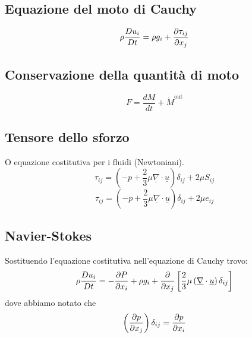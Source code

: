 \subsection{Equazione del moto di Cauchy}
\[
  \rho \frac{D u_i}{Dt}=\rho g_i+\frac{\partial\tau_{ij} }{\partial x_j}
\]
\subsection{Conservazione della quantità di moto}

\[
  F = \frac{dM}{dt}+\dot{M}^{\text{out}} 
\]
\subsection{Tensore dello sforzo}
O equazione costitutiva per i fluidi (Newtoniani).
\[
  \tau_{ij} = \left( -p +\frac{2}{3}\mu \underline{\nabla}\cdot \underline{u}\right) \delta_{ij} +2\mu S_{ij}
\]
\[
  \tau_{ij} = \left( -p +\frac{2}{3}\mu \underline{\nabla}\cdot \underline{u}\right) \delta_{ij} +2\mu e_{ij}
\]
\subsection{Navier-Stokes}
Sostituendo l'equazione costitutiva nell'equazione di Cauchy trovo:
\[
  \rho \frac{D u_i}{Dt}=-\frac{\partial P}{\partial x_i}+\rho g_i+\frac{\partial}{\partial x_j}\left[ \frac{2}{3}\mu \left( \underline{\nabla}\cdot \underline{u}\right) \delta_{ij} \right]
\]
dove abbiamo notato che 
\[
  \left( \frac{\partial p}{\partial x_j}\right) \delta_{ij} =\frac{\partial p}{\partial x_i}
\]
